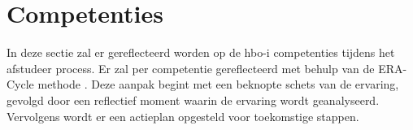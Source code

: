 \section{Competenties}
In deze sectie zal er gereflecteerd worden op de hbo-i \parencite{HBOICompetenties} competenties tijdens het afstudeer process.
Er zal per competentie gereflecteerd met behulp van de ERA-Cycle methode \parencite{BeginningReflectivePractice}.
Deze aanpak begint met een beknopte schets van de ervaring, gevolgd door een reflectief moment waarin de ervaring wordt geanalyseerd.
Vervolgens wordt er een actieplan opgesteld voor toekomstige stappen.







